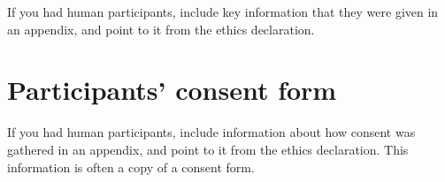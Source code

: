 \documentclass[logo,bsc,singlespacing,parskip]{infthesis}
\theoremstyle{definition}
\theoremstyle{example}
\theoremstyle{theorem}
\theoremstyle{theorem}
\theoremstyle{theorem}
\theoremstyle{definition}
\theoremstyle{definition}
\theoremstyle{definition}
\begin{document}
If you had human participants, include key information that they were given in
an appendix, and point to it from the ethics declaration.

\chapter{Participants' consent form}

If you had human participants, include information about how consent was
gathered in an appendix, and point to it from the ethics declaration.
This information is often a copy of a consent form.
\end{document}
